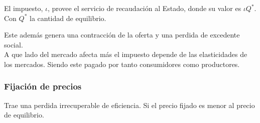 El impuesto, $\iota$, provee el servicio de recaudación al Estado, donde su valor es $\iota Q^*$. Con $Q^*$ la cantidad de equilibrio.


Este además genera una contracción de la oferta y una perdida de excedente social.\\


A que lado del mercado afecta más el impuesto depende de las elasticidades de los mercados. Siendo este pagado por tanto consumidores como productores.

\subsubsection{Fijación de precios}
Trae una perdida irrecuperable de eficiencia. Si el precio fijado es menor al precio de equilibrio.

\newpage